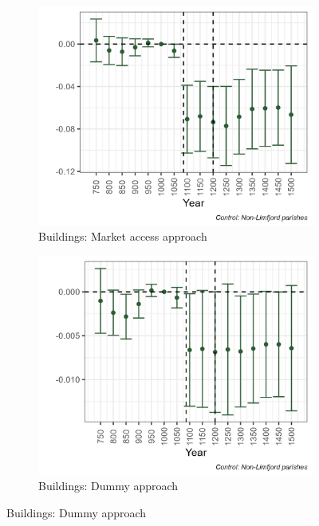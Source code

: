 \documentclass[11pt]{article}
\begin{document}
\begin{figure}[h!]
\begin{subfigure}[b]{0.45\textwidth}
    \end{subfigure}
    \vspace{0.45cm}
    \begin{subfigure}[b]{0.45\textwidth}
        \centering
        \caption{\label{fig:arch1c} Buildings: Market access approach}
        \includegraphics[width=\textwidth]{Plots/Regression_plots/arch_MA_buildings.png}
    \end{subfigure}
    \hfill
    \begin{subfigure}[b]{0.45\textwidth}
        \centering
        \caption{\label{fig:arch1d} Buildings: Dummy approach}
        \includegraphics[width=\textwidth]{Plots/Regression_plots/arch_dummy_buildings.png}

\end{subfigure}
\end{figure}
\end{document}
